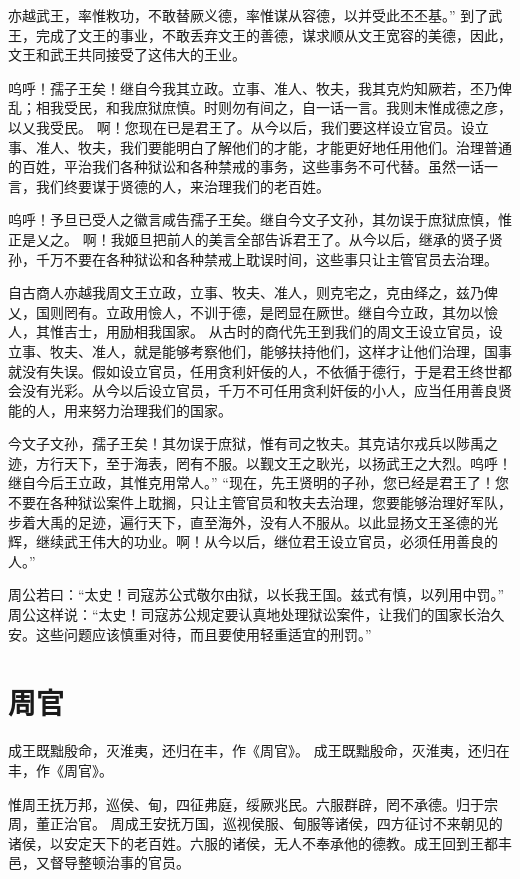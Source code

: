 \documentclass[a4paper,12pt,UTF8,twoside]{ctexbook}
\begin{document}
亦越武王，率惟敉功，不敢替厥义德，率惟谋从容德，以并受此丕丕基。”
到了武王，完成了文王的事业，不敢丢弃文王的善德，谋求顺从文王宽容的美德，因此，文王和武王共同接受了这伟大的王业。

呜呼！孺子王矣！继自今我其立政。立事、准人、牧夫，我其克灼知厥若，丕乃俾乱；相我受民，和我庶狱庶慎。时则勿有间之，自一话一言。我则末惟成德之彦，以乂我受民。
啊！您现在已是君王了。从今以后，我们要这样设立官员。设立事、准人、牧夫，我们要能明白了解他们的才能，才能更好地任用他们。治理普通的百姓，平治我们各种狱讼和各种禁戒的事务，这些事务不可代替。虽然一话一言，我们终要谋于贤德的人，来治理我们的老百姓。

呜呼！予旦已受人之徽言咸告孺子王矣。继自今文子文孙，其勿误于庶狱庶慎，惟正是乂之。
啊！我姬旦把前人的美言全部告诉君王了。从今以后，继承的贤子贤孙，千万不要在各种狱讼和各种禁戒上耽误时间，这些事只让主管官员去治理。

自古商人亦越我周文王立政，立事、牧夫、准人，则克宅之，克由绎之，兹乃俾乂，国则罔有。立政用憸人，不训于德，是罔显在厥世。继自今立政，其勿以憸人，其惟吉士，用励相我国家。
从古时的商代先王到我们的周文王设立官员，设立事、牧夫、准人，就是能够考察他们，能够扶持他们，这样才让他们治理，国事就没有失误。假如设立官员，任用贪利奸佞的人，不依循于德行，于是君王终世都会没有光彩。从今以后设立官员，千万不可任用贪利奸佞的小人，应当任用善良贤能的人，用来努力治理我们的国家。

今文子文孙，孺子王矣！其勿误于庶狱，惟有司之牧夫。其克诘尔戎兵以陟禹之迹，方行天下，至于海表，罔有不服。以觐文王之耿光，以扬武王之大烈。呜呼！继自今后王立政，其惟克用常人。”
“现在，先王贤明的子孙，您已经是君王了！您不要在各种狱讼案件上耽搁，只让主管官员和牧夫去治理，您要能够治理好军队，步着大禹的足迹，遍行天下，直至海外，没有人不服从。以此显扬文王圣德的光辉，继续武王伟大的功业。啊！从今以后，继位君王设立官员，必须任用善良的人。”

周公若曰：“太史！司寇苏公式敬尔由狱，以长我王国。兹式有慎，以列用中罚。”
周公这样说：“太史！司寇苏公规定要认真地处理狱讼案件，让我们的国家长治久安。这些问题应该慎重对待，而且要使用轻重适宜的刑罚。”

\chapter{周官}

成王既黜殷命，灭淮夷，还归在丰，作《周官》。
成王既黜殷命，灭淮夷，还归在丰，作《周官》。

惟周王抚万邦，巡侯、甸，四征弗庭，绥厥兆民。六服群辟，罔不承德。归于宗周，董正治官。
周成王安抚万国，巡视侯服、甸服等诸侯，四方征讨不来朝见的诸侯，以安定天下的老百姓。六服的诸侯，无人不奉承他的德教。成王回到王都丰邑，又督导整顿治事的官员。
\end{document}

